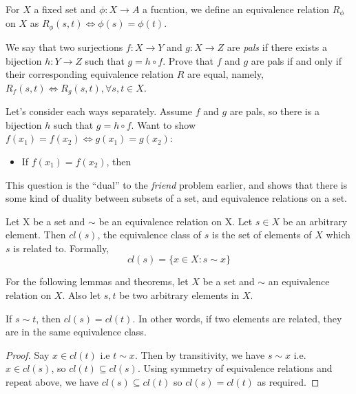 \documentclass[11pt]{article}
\begin{document}
\begin{problem}
  For \(X\) a fixed set and \(\phi:X\to A\) a fucntion, we define an equivalence relation \(R_\phi\) on \(X\) as \(R_\phi(s,t) \iff \phi(s) = \phi(t)\).

  We say that two surjections \(f:X\to Y\) and \(g:X\to Z\) are \emph{pals} if there exists a bijection \(h:Y\to Z\) such that \(g = h\circ f\). Prove that \(f\) and \(g\) are pals if and only if their corresponding equivalence relation \(R\) are equal, namely, \(R_f(s,t) \iff R_g(s,t), \forall s,t \in X\).
\end{problem}
\begin{solution}
  Let's consider each ways separately.
  \subproof{\(\implies\)}
  Assume \(f\) and \(g\) are pals, so there is a bijection \(h\) such that \(g = h \circ f\). Want to show \(f(x_1)=f(x_2) \iff g(x_1)=g(x_2)\):
  \begin{itemize}
    \item If \(f(x_1)=f(x_2)\), then
  \end{itemize}

  \subproof{\(\impliedby\)}
\end{solution}
\begin{remark}
  This question is the “dual” to the \emph{friend} problem earlier, and shows that there is some kind of duality between subsets of a set, and equivalence relations on a set. 
\end{remark}

\begin{definition}
  Let X be a set and \(\sim\) be an equivalence relation on X. Let \(s \in X\) be an arbitrary element. Then \(cl(s)\), the equivalence class of \(s\) is the set of elements of \(X\) which \(s\) is related to. Formally,
  \begin{equation*}
    cl(s)= \{x \in X : s \sim x \}
  \end{equation*}
\end{definition}


For the following lemmas and theorems, let \(X\) be a set and \(\sim\) an equivalence relation on \(X\). Also let \(s,t\) be two arbitrary elements in \(X\).


\begin{lemma}
  If \(s \sim t\), then \(cl(s) = cl(t)\). In other words, if two elements are related, they are in the same equivalence class.
\end{lemma}
\begin{proof}
  Say \(x \in cl(t)\) i.e \(t \sim x\). Then by transitivity, we have \(s \sim x\) i.e. \(x \in cl(s)\), so \(cl(t) \subseteq cl(s)\). Using symmetry of equivalence relations and repeat above, we have \(cl(s) \subseteq cl(t)\) so \(cl(s)=cl(t)\) as required.
\end{proof}
\end{document}
